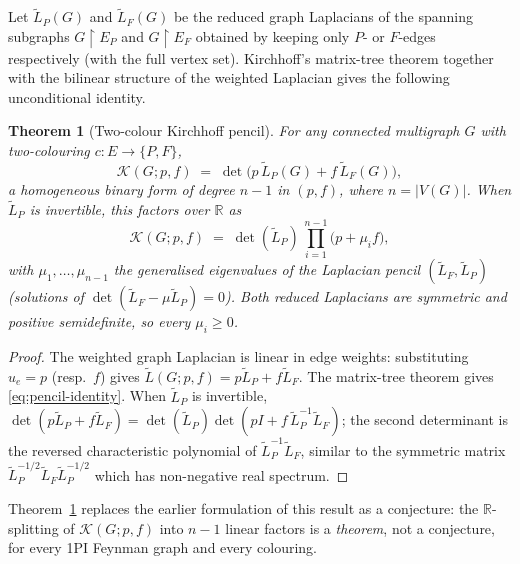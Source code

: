 \documentclass[11pt,a4paper]{article}
\theoremstyle{plain}
\newtheorem{theorem}{Theorem}
\begin{document}
Let $\widetilde L_P(G)$ and $\widetilde L_F(G)$ be the reduced graph
Laplacians of the spanning subgraphs $G\!\upharpoonright\!E_P$ and
$G\!\upharpoonright\!E_F$ obtained by keeping only $P$- or $F$-edges
respectively (with the full vertex set).  Kirchhoff's matrix-tree
theorem together with the bilinear structure of the weighted
Laplacian gives the following unconditional identity.

\begin{theorem}[Two-colour Kirchhoff pencil]
\label{thm:pencil}
For any connected multigraph $G$ with two-colouring
$c : E \to \{P,F\}$,
\begin{equation}\label{eq:pencil-identity}
  \mathcal{K}(G; p, f)
  \;=\; \det\bigl(p\,\widetilde L_P(G) + f\,\widetilde L_F(G)\bigr),
\end{equation}
a homogeneous binary form of degree $n{-}1$ in $(p,f)$, where
$n = |V(G)|$.  When $\widetilde L_P$ is invertible, this factors
over $\mathbb{R}$ as
\begin{equation}\label{eq:pencil-product}
  \mathcal{K}(G; p, f)
  \;=\; \det(\widetilde L_P)\,\prod_{i=1}^{n-1}\bigl(p + \mu_i f\bigr),
\end{equation}
with $\mu_1, \ldots, \mu_{n-1}$ the generalised eigenvalues of the
Laplacian pencil $(\widetilde L_F, \widetilde L_P)$
(solutions of $\det(\widetilde L_F - \mu \widetilde L_P) = 0$).  Both
reduced Laplacians are symmetric and positive semidefinite, so
every $\mu_i \geq 0$.
\end{theorem}

\begin{proof}
The weighted graph Laplacian is linear in edge weights:
substituting $u_e = p$ (resp.\ $f$) gives
$\widetilde L(G; p, f) = p\widetilde L_P + f\widetilde L_F$.  The matrix-tree
theorem gives \eqref{eq:pencil-identity}.  When $\widetilde L_P$ is
invertible,
$\det(p\widetilde L_P + f\widetilde L_F) = \det(\widetilde L_P) \det(p I + f\,
\widetilde L_P^{-1}\widetilde L_F)$;
the second determinant is the reversed characteristic polynomial
of $\widetilde L_P^{-1}\widetilde L_F$, similar to the symmetric matrix
$\widetilde L_P^{-1/2}\widetilde L_F \widetilde L_P^{-1/2}$ which has
non-negative real spectrum.
\end{proof}

Theorem~\ref{thm:pencil} replaces the earlier formulation of this
result as a conjecture: the $\mathbb{R}$-splitting of
$\mathcal{K}(G;p,f)$ into $n{-}1$ linear factors is a
\emph{theorem}, not a conjecture, for every 1PI Feynman graph and
every colouring.
\end{document}
